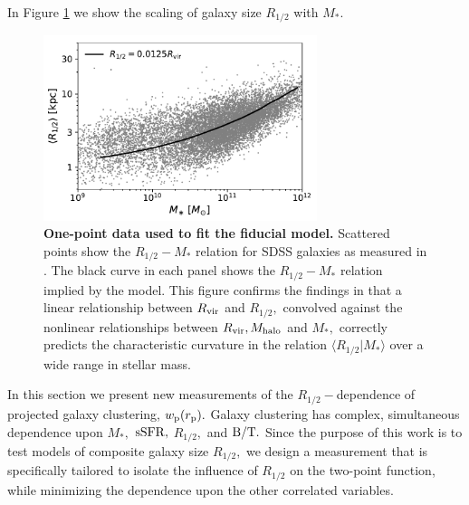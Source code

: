 \documentclass[usenatbib,usegraphicx,letterpaper]{mn2e}
\newcommand{\rhalf}{R_{1/2}}
\newcommand{\bt}{{\rm B/T}}
\newcommand{\mstar}{M_{\ast}}
\newcommand{\ssfr}{{\rm sSFR}}
\newcommand{\mhalo}{M_{\rm halo}}
\newcommand{\rvir}{R_{\rm vir}}
\newcommand{\rproj}{r_{\rm p}}
\newcommand{\wproj}{w_{\rm p}}
\begin{document}

In Figure \ref{fig:scatter_plot} we show the scaling of galaxy size $\rhalf$ with $\mstar.$ 

\begin{figure}
\centering
\includegraphics[width=8cm]{FIGS/single_component_model_vs_sdss_one_point.pdf}
\caption{
{\bf One-point data used to fit the fiducial model.}
Scattered points show the $\rhalf-\mstar$ relation for SDSS galaxies as measured in \citet{meert_etal15}. The black curve in each panel shows the $\rhalf-\mstar$ relation implied by the model. This figure confirms the findings in \citet{kravtsov13} that a linear relationship between $\rvir$ and $\rhalf,$ convolved against the nonlinear relationships between $\rvir, \mhalo$ and $\mstar,$ correctly predicts the characteristic curvature in the relation $\langle\rhalf\vert\mstar\rangle$ over a wide range in stellar mass.
}
\label{fig:scatter_plot}
\end{figure}

In this section we present new measurements of the $\rhalf-$dependence of projected galaxy clustering, $\wproj(\rproj).$ Galaxy clustering has complex, simultaneous dependence upon $\mstar,$ $\ssfr,$ $\rhalf,$ and $\bt.$ Since the purpose of this work is to test models of composite galaxy size $\rhalf,$ we design a measurement that is specifically tailored to isolate the influence of $\rhalf$ on the two-point function, while minimizing the dependence upon the other correlated variables.
\end{document}
